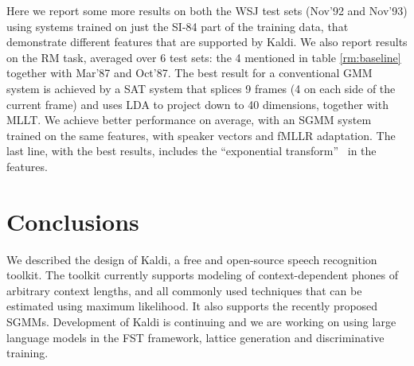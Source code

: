 \documentclass[10pt,conference,letterpaper]{IEEEtran}
\begin{document}
Here we report some more results on both the WSJ test sets (Nov'92 and Nov'93) 
using systems trained on just the SI-84 part of the training data, that
demonstrate different features that are supported by Kaldi. 
We also report results on the RM task, averaged over 6 test sets: the 4 
mentioned in table \ref{rm:baseline} together with Mar'87 and Oct'87. The best 
result for a conventional GMM system is achieved by a SAT 
system that splices 9 frames (4 on each side of the 
current frame) and uses LDA to project down to 40 dimensions, together with 
MLLT.  We achieve better performance on average, with an SGMM system trained
on the same features, with speaker vectors and fMLLR adaptation.  The last
line, with the best results, includes the ``exponential transform''~\cite{asru_et} in
the features.

\begin{table}
\end{table}

\section{Conclusions}
\label{sec:conclusion}
We described the design of Kaldi, a free and open-source speech recognition 
toolkit. The toolkit currently supports modeling of context-dependent phones of 
arbitrary context lengths, and all commonly used techniques that can be 
estimated using maximum likelihood. It also supports the recently proposed 
SGMMs. Development of Kaldi is continuing and we are working on using large 
language models in the FST framework, lattice generation and discriminative 
training.
\end{document}
